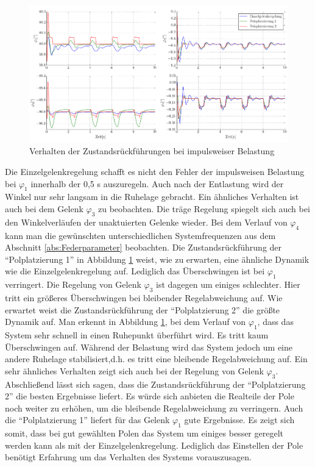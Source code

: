 	\begin{figure}[h!]
		\centering
		\includegraphics[scale=0.65]{Bilder/Ergebnissse_Zustandsrueckfuehrung.pdf}
		\caption{Verhalten der Zustandsrückführungen bei impulsweiser Belastung}
		\label{fig:Ergebnis_Zustandsruckfuhrung}
	\end{figure}

Die Einzelgelenkregelung schafft es nicht den Fehler der impulsweisen Belastung bei $\varphi_1$ innerhalb der 0,5 s auszuregeln. Auch nach der Entlastung wird der Winkel nur sehr langsam in die Ruhelage gebracht. Ein ähnliches Verhalten ist auch bei dem Gelenk  $\varphi_3$ zu beobachten. Die träge Regelung spiegelt sich auch bei den Winkelverläufen der unaktuierten Gelenke wieder. Bei dem Verlauf von $\varphi_4$ kann man die gewünschten unterschiedlichen Systemfrequenzen aus dem Abschnitt \ref{abs:Federparameter} beobachten.\newline
Die Zustandsrückführung der "`Polplatzierung 1"' in Abbildung \ref{fig:Ergebnis_Zustandsruckfuhrung} weist, wie zu erwarten, eine ähnliche Dynamik wie die Einzelgelenkregelung auf. Lediglich das Überschwingen ist bei $\varphi_1$ verringert. Die Regelung von Gelenk $\varphi_3$ ist dagegen um einiges schlechter. Hier tritt ein größeres Überschwingen bei bleibender Regelabweichung auf. \newline
Wie erwartet weist die Zustandsrückführung der "`Polplatzierung 2"' die größte Dynamik auf. Man erkennt in Abbildung \ref{fig:Ergebnis_Zustandsruckfuhrung}, bei dem Verlauf von $\varphi_1$, dass das System sehr schnell in einen Ruhepunkt überführt wird. Es tritt kaum Überschwingen auf. Während der Belastung wird das System jedoch um eine andere Ruhelage stabilisiert,d.h. es tritt eine bleibende Regelabweichung auf. Ein sehr ähnliches Verhalten zeigt sich auch bei der Regelung von Gelenk $\varphi_3$.\newline
Abschließend lässt sich sagen, dass die Zustandsrückführung der "`Polplatzierung 2"' die besten Ergebnisse liefert. Es würde sich anbieten die Realteile der Pole noch weiter zu erhöhen, um die bleibende Regelabweichung zu verringern. Auch die "`Polplatzierung 1"' liefert für das Gelenk $\varphi_1$ gute Ergebnisse. Es zeigt sich somit, dass bei gut gewählten Polen das System um einiges besser geregelt werden kann als mit der Einzelgelenkregelung. Lediglich das Einstellen der Pole benötigt Erfahrung um das Verhalten des Systems vorauszusagen. 

